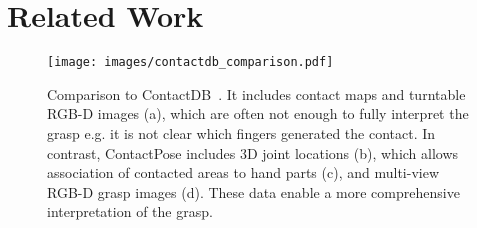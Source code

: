 \documentclass[runningheads]{llncs}
\begin{document}
%
 \section{Related Work} \label{sec:related_work}

\begin{figure}
  \texttt{[image: images/contactdb\_comparison.pdf]}
  \caption{Comparison to ContactDB~\cite{contactdbv1}. It includes contact maps and turntable RGB-D images (a), which are often not enough to fully interpret the grasp e.g. it is not clear which fingers generated the contact. In contrast, ContactPose includes 3D joint locations (b), which allows association of contacted areas to hand parts (c), and multi-view RGB-D grasp images (d). These data enable a more comprehensive interpretation of the grasp.}
  \label{fig:contactdb_comparison}
\end{figure}
\end{document}
